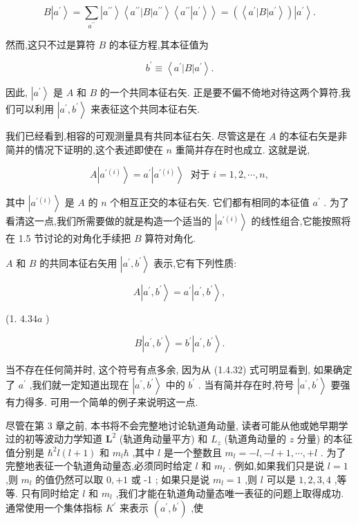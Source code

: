 \documentclass[lang=cn,newtx,10pt,scheme=chinese,thmcnt=section]{elegantbook}
\begin{document}
$$
B\left| {a}^{\prime }\right\rangle = \mathop{\sum }\limits_{{a}^{\prime \prime }}\left| {a}^{\prime \prime }\right\rangle \left\langle {{a}^{\prime \prime }\left| B\right| {a}^{\prime \prime }}\right\rangle \left\langle {{a}^{\prime \prime }\left| {a}^{\prime }\right\rangle }\right\rangle = \left( \left\langle {{a}^{\prime }\left| B\right| {a}^{\prime }}\right\rangle \right) \left| {a}^{\prime }\right\rangle . \tag{1. 4.31}
$$

然而,这只不过是算符 $B$ 的本征方程,其本征值为

$$
{b}^{\prime } \equiv \left\langle {{a}^{\prime }\left| B\right| {a}^{\prime }}\right\rangle . \tag{1. 4.32}
$$

因此, $\left| {a}^{\prime }\right\rangle$ 是 $A$ 和 $B$ 的一个共同本征右矢. 正是要不偏不倚地对待这两个算符,我们可以利用 $\left| {{a}^{\prime },{b}^{\prime }}\right\rangle$ 来表征这个共同本征右矢.

我们已经看到,相容的可观测量具有共同本征右矢. 尽管这是在 $A$ 的本征右矢是非简并的情况下证明的,这个表述即使在 $n$ 重简并存在时也成立. 这就是说,

$$
A\left| {a}^{\prime \left( i\right) }\right\rangle = {a}^{\prime }\left| {a}^{\prime \left( i\right) }\right\rangle \;\text{ 对于 }i = 1,2,\cdots, n, \tag{1. 4.33}
$$

其中 $\left| {a}^{\prime \left( i\right) }\right\rangle$ 是 $A$ 的 $n$ 个相互正交的本征右矢. 它们都有相同的本征值 ${a}^{\prime }$ . 为了看清这一点,我们所需要做的就是构造一个适当的 $\left| {a}^{\prime \left( i\right) }\right\rangle$ 的线性组合,它能按照将在 1.5 节讨论的对角化手续把 $B$ 算符对角化.

$A$ 和 $B$ 的共同本征右矢用 $\left| {{a}^{\prime },{b}^{\prime }}\right\rangle$ 表示,它有下列性质:

$$
A\left| {{a}^{\prime },{b}^{\prime }}\right\rangle = {a}^{\prime }\left| {{a}^{\prime },{b}^{\prime }}\right\rangle ,
$$

(1. ${4.34a}$ )

$$
B\left| {{a}^{\prime },{b}^{\prime }}\right\rangle = {b}^{\prime }\left| {{a}^{\prime },{b}^{\prime }}\right\rangle . \tag{1. 4.34b}
$$

当不存在任何简并时, 这个符号有点多余, 因为从 (1.4.32) 式可明显看到, 如果确定了 ${a}^{\prime }$ ,我们就一定知道出现在 $\left| {{a}^{\prime },{b}^{\prime }}\right\rangle$ 中的 ${b}^{\prime }$ . 当有简并存在时,符号 $\left| {{a}^{\prime },{b}^{\prime }}\right\rangle$ 要强有力得多. 可用一个简单的例子来说明这一点.

尽管在第 3 章之前, 本书将不会完整地讨论轨道角动量, 读者可能从他或她早期学过的初等波动力学知道 ${\mathbf{L}}^{2}$ (轨道角动量平方) 和 ${L}_{z}$ (轨道角动量的 $z$ 分量) 的本征值分别是 ${\hbar }^{2}l\left( {l + 1}\right)$ 和 ${m}_{l}\hbar$ ,其中 $l$ 是一个整数且 ${m}_{l} = - l, - l + 1,\cdots , + l$ . 为了完整地表征一个轨道角动量态,必须同时给定 $l$ 和 ${m}_{l}$ . 例如,如果我们只是说 $l = 1$ ,则 ${m}_{l}$ 的值仍然可以取 $0, + 1$ 或 -1 ; 如果只是说 ${m}_{l} = 1$ ,则 $l$ 可以是 $1,2,3,4$ ,等等. 只有同时给定 $l$ 和 ${m}_{l}$ ,我们才能在轨道角动量态唯一表征的问题上取得成功. 通常使用一个集体指标 ${K}^{\prime }$ 来表示 $\left( {{a}^{\prime },{b}^{\prime }}\right)$ ,使
\end{document}
